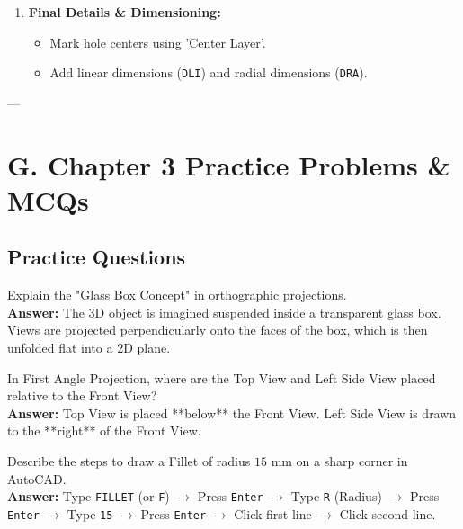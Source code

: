 \begin{enumerate}
\begin{itemize}
        \item Project horizontal lines from Front View into Side View quadrant.
        \item Trace Side View outlines at grid intersections.
    \end{itemize}
    \item \textbf{Final Details \& Dimensioning:}
    \begin{itemize}
        \item Mark hole centers using 'Center Layer'.
        \item Add linear dimensions (\texttt{DLI}) and radial dimensions (\texttt{DRA}).
    \end{itemize}
\end{enumerate}

---

\section{G. Chapter 3 Practice Problems \& MCQs}

\subsection{Practice Questions}

\begin{vivaqa}
Explain the "Glass Box Concept" in orthographic projections.\\[4pt]
\textbf{Answer:} The 3D object is imagined suspended inside a transparent glass box. Views are projected perpendicularly onto the faces of the box, which is then unfolded flat into a 2D plane.
\end{vivaqa}

\begin{vivaqa}
In First Angle Projection, where are the Top View and Left Side View placed relative to the Front View?\\[4pt]
\textbf{Answer:} Top View is placed **below** the Front View. Left Side View is drawn to the **right** of the Front View.
\end{vivaqa}

\begin{vivaqa}
Describe the steps to draw a Fillet of radius $15\text{ mm}$ on a sharp corner in AutoCAD.\\[4pt]
\textbf{Answer:} Type \texttt{FILLET} (or \texttt{F}) $\to$ Press \texttt{Enter} $\to$ Type \texttt{R} (Radius) $\to$ Press \texttt{Enter} $\to$ Type \texttt{15} $\to$ Press \texttt{Enter} $\to$ Click first line $\to$ Click second line.
\end{vivaqa}

